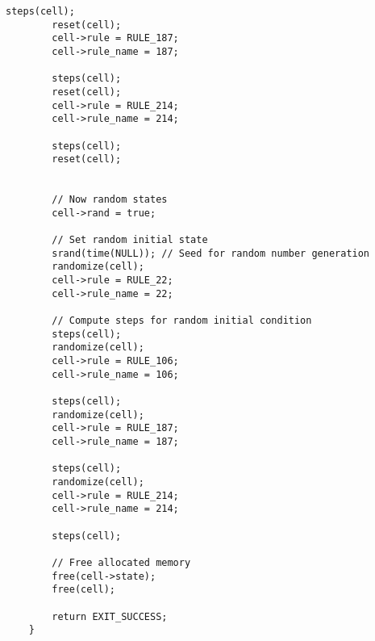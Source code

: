 \documentclass[12pt,a4paper]{article}
\begin{document}
\begin{lstlisting}[caption={Main (1d\_states.c)},label={lst:p7001},basicstyle=\ttfamily\tiny]
        steps(cell);
        reset(cell); 
        cell->rule = RULE_187;
        cell->rule_name = 187;

        steps(cell);
        reset(cell); 
        cell->rule = RULE_214;
        cell->rule_name = 214;

        steps(cell);
        reset(cell); 


        // Now random states
        cell->rand = true;

        // Set random initial state
        srand(time(NULL)); // Seed for random number generation
        randomize(cell);
        cell->rule = RULE_22;
        cell->rule_name = 22;

        // Compute steps for random initial condition
        steps(cell);
        randomize(cell); 
        cell->rule = RULE_106;
        cell->rule_name = 106;

        steps(cell);
        randomize(cell); 
        cell->rule = RULE_187;
        cell->rule_name = 187;

        steps(cell);
        randomize(cell); 
        cell->rule = RULE_214;
        cell->rule_name = 214;

        steps(cell);

        // Free allocated memory
        free(cell->state);
        free(cell);

        return EXIT_SUCCESS;
    }
\end{lstlisting}
\end{document}
